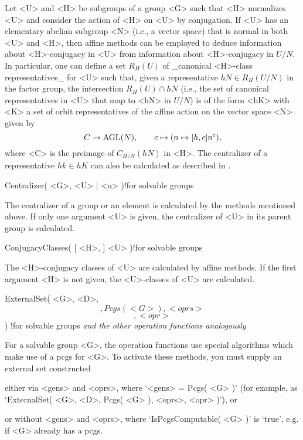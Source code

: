 Let <U> and <H> be subgroups of a group <G>  such that <H> normalizes <U>
and consider the   action of <H> on  <U>  by conjugation. If   <U> has an
elementary abelian subgroup <N> (i.e., a vector space)  that is normal in
both  <U> and   <H>, then  affine   methods  can  be employed to   deduce
information   about   <H>-conjugacy    in  <U>  from   information  about
<H>-conjugacy in $U/N$.  In particular, one  can define a set $R_H(U)$ of
_canonical <H>-class    representatives_   for <U>  such  that,  given  a
representative  $hN\in  R_H(U/N)$ in  the  factor group, the intersection
$R_H(U) \cap hN$ (i.e., the set  of canonical representatives in <U> that
map  to <hN>  in  $U/N$) is of   the form <hK>   with <K> a set of  orbit
representatives of the affine action on the vector space <N> given by
$$ C \to {\rm AGL}(N), \qquad c \mapsto ( n \mapsto [h,c] n^c ), $$
where <C> is the preimage  of $C_{H/N}(hN)$ in  <H>. The centralizer of a
representative  $hk  \in  hK$  can also  be   calculated  as described in
\cite{MeckyNeubuser89}.

\>Centralizer( <G>, <U> | <u> )!{for solvable groups}

The centralizer of a  group or an element   is calculated by  the methods
mentioned  above. If only one argument  <U> is given,  the centralizer of
<U> in its parent group is calculated.

\>ConjugacyClasses( [ <H>, ] <U> )!{for solvable groups}

The <H>-conjugacy classes of <U> are calculated by affine methods. If the
first argument <H> is not given, the <U>-classes of <U> are calculated.


\>ExternalSet( <G>, <D>, \[, {Pcgs( <G> )}, <oprs> \] \[, <opr> \] )%
  !{for solvable groups}
\)\it and the other operation functions analogously

For a solvable group <G>, the  operation functions use special algorithms
which make use of  a pcgs for  <G>. To activate  these methods, you  must
supply an external set constructed
\medskip
\item
  either via <gens>    and <oprs>, where `<gens>   =  Pcgs( <G>  )'  (for
  example, as `ExternalSet( <G>, <D>, Pcgs( <G> ), <oprs>, <opr> )'), or
\item
  or without   <gens> and  <oprs>, where   `IsPcgsComputable(  <G> )'  is
  `true', e.g. if <G> already has a pcgs.

